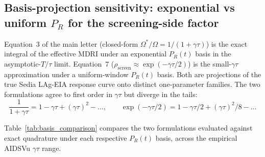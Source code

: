 \documentclass[11pt]{article}
\begin{document}
\subsection{Basis-projection sensitivity: exponential vs uniform \texorpdfstring{$P_R$}{PR} for the screening-side factor}\label{sec:basis_projection}


Equation~3 of the main letter (closed-form $\Omega^*/\Omega = 1/(1+\gamma\tau)$) is the exact integral of the effective MDRI under an exponential $P_R(t)$ basis in the asymptotic-$T/\tau$ limit. Equation~7 ($\rho_{\mathrm{screen}} \approx \exp(-\gamma\tau/2)$) is the small-$\gamma\tau$ approximation under a uniform-window $P_R(t)$ basis. Both are projections of the true Sedia LAg-EIA response curve onto distinct one-parameter families. The two formulations agree to first order in $\gamma\tau$ but diverge in the tails:
\begin{equation}
\frac{1}{1+\gamma\tau} = 1 - \gamma\tau + (\gamma\tau)^2 - \ldots, \qquad \exp(-\gamma\tau/2) = 1 - \gamma\tau/2 + (\gamma\tau)^2/8 - \ldots
\end{equation}

Table~\ref{tab:basis_comparison} compares the two formulations evaluated against exact quadrature under each respective $P_R(t)$ basis, across the empirical AIDSVu $\gamma\tau$ range.
\end{document}
